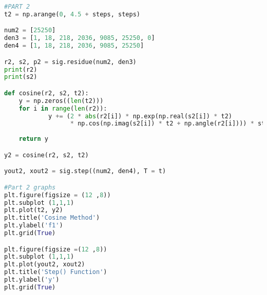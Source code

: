 \documentclass[12pt]{report}
\begin{document}
\begin{lstlisting}[language=Python, caption=Part 2 Code]
#PART 2
t2 = np.arange(0, 4.5 + steps, steps)

num2 = [25250]
den3 = [1, 18, 218, 2036, 9085, 25250, 0]
den4 = [1, 18, 218, 2036, 9085, 25250]

r2, s2, p2 = sig.residue(num2, den3)
print(r2)
print(s2)

def cosine(r2, s2, t2):
    y = np.zeros((len(t2)))
    for i in range(len(r2)):
            y += (2 * abs(r2[i]) * np.exp(np.real(s2[i]) * t2) 
                  * np.cos(np.imag(s2[i]) * t2 + np.angle(r2[i]))) * step(t2)
        
    return y

y2 = cosine(r2, s2, t2)

yout2, xout2 = sig.step((num2, den4), T = t)

#Part 2 graphs
plt.figure(figsize = (12 ,8))
plt.subplot (1,1,1)
plt.plot(t2, y2)
plt.title('Cosine Method')
plt.ylabel('f1')
plt.grid(True)

plt.figure(figsize =(12 ,8))
plt.subplot (1,1,1)
plt.plot(yout2, xout2)
plt.title('Step() Function')
plt.ylabel('y')
plt.grid(True)
\end{lstlisting}
\end{document}
